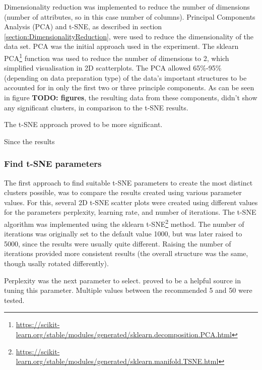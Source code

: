 
Dimensionality reduction was implemented to reduce the number of dimensions (number of attributes, so in this case number of columns). Principal Components Analysis (PCA) and t-SNE, as described in section \ref{section:DimensionalityReduction}, were used to reduce the dimensionality of the data set. PCA was the initial approach used in the experiment. The sklearn PCA\footnote{\url{https://scikit-learn.org/stable/modules/generated/sklearn.decomposition.PCA.html}} function was used to reduce the number of dimensions to 2, which simplified visualisation in 2D scatterplots. The PCA allowed 65\%-95\% (depending on data preparation type) of the data's important structures to be accounted for in only the first two or three principle components. As can be seen in figure \textbf{TODO: figures}, the resulting data from these components, didn't show any significant clusters, in comparison to the t-SNE results.

The t-SNE approach proved to be more significant.

Since the results 


\subsubsection{Find t-SNE parameters}
The first approach to find suitable t-SNE parameters to create the most distinct clusters possible, was to compare the results created using various parameter values. For this, several 2D t-SNE scatter plots were created using different values for the parameters perplexity, learning rate, and number of iterations. The t-SNE algorithm was implemented using the sklearn t-SNE\footnote{\url{https://scikit-learn.org/stable/modules/generated/sklearn.manifold.TSNE.html}} method. The number of iterations was originally set to the default value 1000, but was later raised to 5000, since the results were usually quite different. Raising the number of iterations provided more consistent results (the overall structure was the same, though usally rotated differently). 

Perplexity was the next parameter to select. \textcite{wattenberg2016how} proved to be a helpful source in tuning this parameter. Multiple values between the recommended 5 and 50 were tested. 

